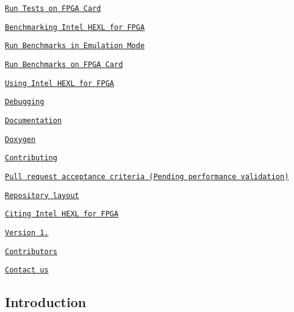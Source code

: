 \begin{DoxyItemize}
\begin{DoxyItemize}
\begin{DoxyItemize}
\item \href{#run-tests-on-fpga-card}{\tt Run Tests on F\-P\-G\-A Card}
\end{DoxyItemize}
\item \href{#benchmarking-intel-hexl-for-fpga}{\tt Benchmarking Intel H\-E\-X\-L for F\-P\-G\-A}
\begin{DoxyItemize}
\item \href{#run-benchmarks-in-emulation-mode}{\tt Run Benchmarks in Emulation Mode}
\item \href{#run-benchmarks-on-fpga-card}{\tt Run Benchmarks on F\-P\-G\-A Card}
\end{DoxyItemize}
\item \href{#using-intel-hexl-for-fpga}{\tt Using Intel H\-E\-X\-L for F\-P\-G\-A}
\item \href{#debugging}{\tt Debugging}
\end{DoxyItemize}
\item \href{#documentation}{\tt Documentation}
\begin{DoxyItemize}
\item \href{#doxygen}{\tt Doxygen}
\end{DoxyItemize}
\item \href{#contributing}{\tt Contributing}
\begin{DoxyItemize}
\item \href{#pull-request-acceptance-criteria-pending-performance-validation}{\tt Pull request acceptance criteria (Pending performance validation)}
\item \href{#repository-layout}{\tt Repository layout}
\end{DoxyItemize}
\item \href{#citing-intel-hexl-for-fpga}{\tt Citing Intel H\-E\-X\-L for F\-P\-G\-A}
\begin{DoxyItemize}
\item \href{#version-10}{\tt Version 1.}
\end{DoxyItemize}
\item \href{#contributors}{\tt Contributors}
\item \href{#contact-us}{\tt Contact us}
\end{DoxyItemize}

\subsection*{Introduction}

